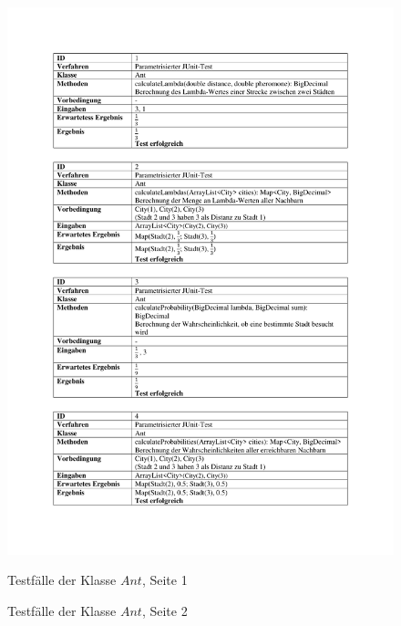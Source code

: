 \begin{appendices}
	\begin{figure}[h]
		\centering
		\caption{Testfälle der Klasse $Ant$, Seite 1}
		\includegraphics[width=\linewidth]{images/Testfaelle_Ant_Seite_1.pdf}
		\label{testAnt1}
	\end{figure}
	\begin{figure}[h]
		\centering
		\caption{Testfälle der Klasse $Ant$, Seite 2}

\end{figure}
\end{appendices}
